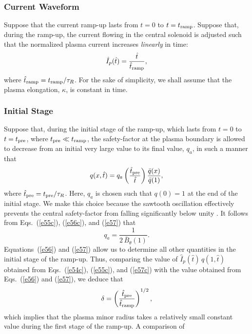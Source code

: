 \documentclass{iopjournal}
\begin{document}
\subsubsection{Current Waveform}
Suppose that the current ramp-up lasts from $t=0$ to $t=t_{\rm ramp}$. Suppose that, during the ramp-up, the current flowing in the central solenoid is adjusted such that
the normalized plasma current increases {\em linearly}\/ in time:
\begin{equation}\label{e56}
\hat{I}_p(\hat{t}) = \frac{\hat{t}}{\hat{t}_{\rm ramp}},
\end{equation}
where $\hat{t}_{\rm ramp} =t_{\rm ramp}/\tau_R$. For the sake of simplicity, we shall assume that the plasma elongation, $\kappa$,  is constant in time. 

\subsubsection{Initial Stage}\label{init}
Suppose that, during the initial stage of the ramp-up, which lasts from $t=0$ to $t=t_{\rm pre}$, where $t_{\rm pre}\ll t_{\rm ramp}$, 
the safety-factor at the plasma boundary is allowed to decrease from an initial very large value to its final value, $q_a$, in such a manner that
\begin{equation}\label{e57}
q(x,\hat{t}) = q_a\left(\frac{\hat{t}_{\rm pre}}{\hat{t}}\right)\frac{\bar{q}(x)}{\bar{q}(1)},
\end{equation}
where $\hat{t}_{\rm pre}= t_{\rm pre}/\tau_R$. Here, $q_a$ is chosen such that $q(0)=1$ at the end of the initial stage. We make this choice because the
sawtooth oscillation effectively prevents the central safety-factor from falling significantly below unity \cite{book}. It follows from Eqs.~(\ref{e55c}),
(\ref{e56c}), and (\ref{e57}) that
\begin{equation}
q_a = \frac{1}{2\,\bar{B}_\theta(1)}.
\end{equation}
Equations~(\ref{e56}) and (\ref{e57}) allow us to determine all other quantities in the initial
stage of the ramp-up. Thus, comparing the value of $\hat{I}_p(\hat{t})\,q(1,\hat{t})$ obtained from Eqs.~(\ref{e54c}), (\ref{e55c}), and (\ref{e57c})
with the value obtained from Eqs.~(\ref{e56}) and (\ref{e57}), we deduce that 
\begin{equation}
\delta = \left(\frac{\hat{t}_{\rm pre}}{\hat{t}_{\rm ramp}}\right)^{1/2},
\end{equation}
which implies that the plasma minor radius takes a relatively small constant value during the first stage of the ramp-up. A comparison of
\end{document}
